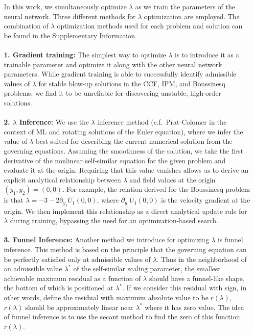 \documentclass[fleqn,11pt]{wlscirep}
\begin{document}
In this work, we simultaneously optimize $\lambda$ as we train the parameters of the neural network. Three different methods for $\lambda$ optimization are employed. The combination of $\lambda$ optimization methods used for each problem and solution can be found in the Supplementary Information.\\
\\
{\bf 1. Gradient training:} The simplest way to optimize $\lambda$ is to introduce it as a trainable parameter and optimize it along with the other neural network parameters\cite{Wang-Lai-GomezSerrano-Buckmaster:pinn-selfsimilar-boussinesq}. While gradient training is able to successfully identify admissible values of $\lambda$ for stable blow-up solutions in the CCF, IPM, and Boussinesq problems, we find it to be unreliable for discovering unstable, high-order solutions.\\
\\
{\bf 2. $\lambda$ Inference:} We use the $\lambda$ inference method (c.f.\ Prat-Colomer \cite{PratColomer:master-thesis} in the context of ML and rotating solutions of the Euler equation), where we infer the value of $\lambda$ best suited for describing the current numerical solution from the governing equations. Assuming the smoothness of the solution, we take the first derivative of the nonlinear self-similar equation for the given problem and evaluate it at the origin. Requiring that this value vanishes allows us to derive an explicit analytical relationship between $\lambda$ and field values at the origin $(y_1, y_2) = (0, 0)$. For example, the relation derived for the Boussinesq problem is that $\lambda = -3-2\partial_{y_1}U_1(0, 0)$, where $\partial_{y_1}U_1(0,0)$ is the velocity gradient at the origin. We then implement this relationship as a direct analytical update rule for $\lambda$ during training, bypassing the need for an optimization-based search.\\
\\
{\bf 3. Funnel Inference:} Another method we introduce for optimizing $\lambda$ is funnel inference. This method is based on the principle that the governing equation can be perfectly satisfied only at admissible values of $\lambda$. Thus in the neighborhood of an admissible value $\lambda^*$ of the self-similar scaling parameter, the smallest achievable maximum residual as a function of $\lambda$ should have a funnel-like shape, the bottom of which is positioned at $\lambda^*$. If we consider this residual with sign, in other words, define the residual with maximum absolute value to be $r(\lambda)$, $r(\lambda)$ should be approximately linear near $\lambda^*$ where it has zero value. The idea of funnel inference is to use the secant method to find the zero of this function $r(\lambda)$.
\end{document}
